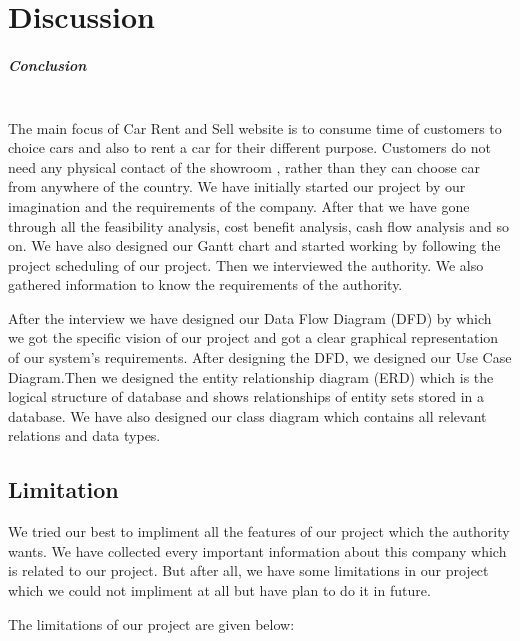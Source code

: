 \chapter{Discussion}

\noindent 

\noindent 
\paragraph{\large{Conclusion}}

\noindent\\ The main focus of Car Rent and Sell website is to consume time of customers to choice cars and also to rent a car for their different purpose. Customers do not need any physical contact of the showroom , rather than they can choose car from anywhere of the country. We have initially started our project by our imagination and the requirements of the company. After that we have gone through all the feasibility analysis, cost benefit analysis, cash flow analysis and so on. We have also designed our Gantt chart and started working by following the project scheduling of our project. Then we interviewed the authority. We also gathered information to know the requirements of the authority.

\noindent After the interview we have designed our Data Flow Diagram (DFD) by which we got the specific vision of our project and got a clear graphical representation of our system's requirements. After designing the DFD, we designed our Use Case Diagram.Then we designed the entity relationship diagram (ERD) which is the logical structure of database and shows relationships of entity sets stored in a database. We have also designed our class diagram which contains all relevant relations and data types.


\noindent 

\noindent 
\section{ Limitation}

\noindent We tried our best to impliment all the features of our project which the authority wants. We have collected every important information about this company which is related to our project. But after all, we have some limitations in our project which we could not impliment at all but have plan to do it in future.

\noindent The limitations of our project are given below:

